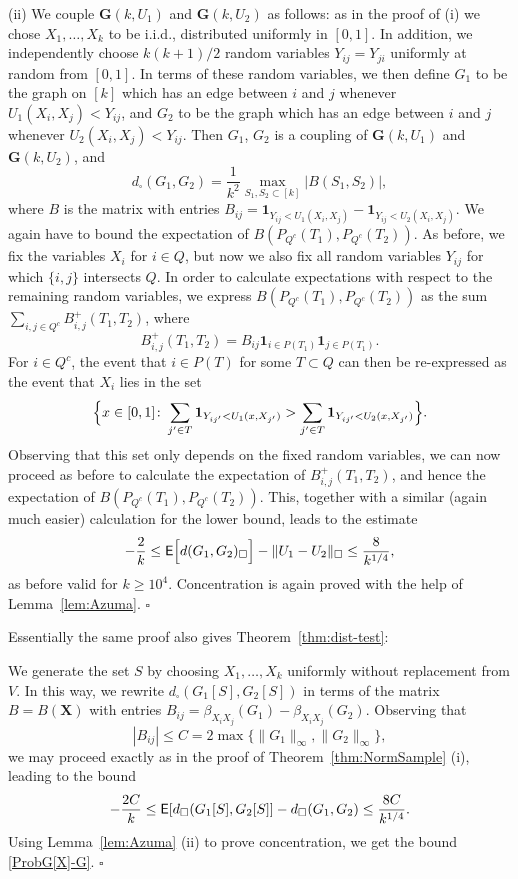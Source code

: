 \documentclass[12pt]{article}
\numberwithin{equation}{section}
\newenvironment{proof}{\medskip\noindent{\bf Proof.
}}{\hfill$\square$\medskip}
\def\E{{\sf E}}
\def\one{{\mathbf 1}}
\def\bG{{\mathbf G}}
\begin{document}
\begin{proof}
(ii)
We couple
$\bG(k,U_1)$ and $\bG(k,U_2)$ as follows: as in the proof
of (i)
we chose $X_1,\dots,X_k$ to be i.i.d., distributed uniformly
in $[0,1]$.  In addition, we independently choose $k(k+1)/2$ random
variables $Y_{ij}=Y_{ji}$
uniformly
at random from $[0,1]$.  In terms of these random variables,
we then define $G_1$ to be the graph on $[k]$
which has an edge between $i$ and $j$
whenever $U_1(X_i,X_j)<Y_{ij}$, and
$G_2$ to be the graph which has an edge
between $i$ and $j$
whenever $U_2(X_i,X_j)<Y_{ij}$.
Then $G_1$, $G_2$ is a coupling of
$\bG(k,U_1)$ and $\bG(k,U_2)$, and
\[
d_\square(G_1,G_2)=
\frac{1}{k^2}\max_{S_1,S_2\subset[k]}|B(S_1,S_2)|,
\]
where $B$ is the matrix with entries
$
B_{ij}=\one_{Y_{ij}<U_1(X_i,X_j)}
-\one_{Y_{ij}<U_2(X_i,X_j)}
$.
We again have to
bound the expectation of
$B(P_{Q^c}(T_1),P_{Q^c}(T_2))$.
As before, we fix the variables
$X_i$ for $i\in Q$, but now we also fix all random variables
$Y_{ij}$ for which $\{i,j\}$ intersects $Q$. In order to
calculate expectations with
respect to the remaining random variables,
we express $B(P_{Q^c}(T_1),P_{Q^c}(T_2))$
as the sum
$\sum_{i,j\in Q^c} B_{i,j}^+(T_1,T_2)$, where
\[
B_{i,j}^+(T_1,T_2)
=B_{ij}\one_{i\in P(T_1)}\one_{j\in P(T_1)}.
\]
For $i\in Q^c$, the event that
$i\in P(T)$ for some $T\subset Q$
can then be re-expressed as the event
that $X_i$ lies in the set
\[
\Bigl\{x\in [0,1]\colon \sum_{j'\in T}
\one_{Y_{ij'}<U_1(x,X_{j'})}
>\sum_{j'\in T}\one_{Y_{ij'}<U_2(x,X_{j'})}\Bigr\}.
\]
Observing that this set only depends on the fixed random
variables, we can now proceed as before to calculate the expectation
of $B_{i,j}^+(T_1,T_2)$, and hence the expectation
of $B(P_{Q^c}(T_1),P_{Q^c}(T_2))$.  This, together with a similar
(again much easier)
calculation for the lower bound, leads to the
estimate
\begin{equation}
\label{ExpG-UpBd}
-\frac 2k
\leq \E\Bigl[d(G_1,G_2)_\square \Bigr]-\|U_1-U_2\|_\square
\leq
\frac{8}{k^{1/4}},
\end{equation}
as before valid for $k\geq 10^4$. Concentration is again proved with
the help of Lemma~\ref{lem:Azuma}.
\end{proof}

Essentially the same proof also gives Theorem~\ref{thm:dist-test}:

\medskip

 We generate the
set $S$ by choosing $X_1,\dots,X_k$ uniformly without replacement
from $V$.  In this way, we rewrite $d_\square(G_1[S],G_2[S])$ in
terms of the matrix $B=B(\mathbf X)$ with entries
$B_{ij}=\beta_{X_iX_j}(G_1)-\beta_{X_iX_j}(G_2)$. Observing that
\[
|B_{ij}|\leq C=2\max\{\|G_1\|_\infty,{\|G_2\|_\infty}\},
\]
we may proceed exactly as in the
proof of Theorem~\ref{thm:NormSample} (i),
leading to the bound
\begin{equation}
\label{ExpG[S]-UpBd}
-\frac {2C}k
\leq \E[d_\square(G_1[S],G_2[S]]-d_\square(G_1,G_2)
\leq \frac {8C}{k^{1/4}}.
\end{equation}
Using Lemma~\ref{lem:Azuma} (ii) to prove concentration, we get
the bound \eqref{ProbG[X]-G}.
\hfill$\square$
\end{document}
